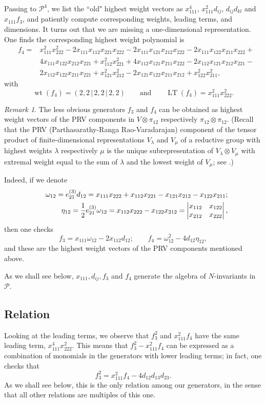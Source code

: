 \documentclass[reqno,11pt]{amsart}
\theoremstyle{remark}
\newtheorem{rem}[equation]{Remark}
\theoremstyle{definition}
\numberwithin{equation}{section}
\newcommand{\bbar}{\,\big|\,}
\newcommand\la{{\lambda}}
\newcommand\ot{\otimes}
\newcommand{\eq}{\begin{equation}}
\newcommand{\eeq}{\end{equation}}
\newcommand{\Pol}{\mathcal{P}}
\newcommand{\wt}{\operatorname{wt}}
\newcommand{\LT}{\operatorname{LT}}
\begin{document}
Passing to $\Pol^4$, we list the ``old" highest weight vectors as $x_{111}^4$, $x_{111}^2d_{ij}$, $d_{ij}d_{kl}$ and $x_{111}f_3$, and patiently compute corresponding weights, leading terms, and dimensions. It turns out that we are missing a one-dimensional representation. One finds the corresponding highest weight polynomial is
\begin{eqnarray*}
& f_4 =& x_{111}^2 x_{222}^2 -2x_{111}x_{112}x_{221}x_{222} -2x_{111}x_{121}x_{212}x_{222}-2x_{111}x_{122}x_{211}x_{222}
+\\
&& 4x_{111}x_{122}x_{212}x_{221}+x_{112}^2 x_{221}^2+4x_{112}x_{121}x_{211}x_{222}-2x_{112}x_{121}x_{212}x_{221}-\\&& 2x_{112}x_{122}x_{211}x_{221}+x_{121}^2x_{212}^2-2x_{121}x_{122}x_{211}x_{212}+x_{122}^2x_{211}^2,
\end{eqnarray*}
with
\[
\wt(f_4)=(2,2\bbar 2,2\bbar 2,2)\qquad\text{and}\qquad \LT(f_4)=x_{111}^2x_{222}^2.
\]
\begin{rem} The less obvious generators $f_3$ and $f_4$ can be obtained as highest weight vectors of the PRV components in $V\otimes\pi_{12}$ respectively $\pi_{12}\otimes\pi_{12}$. (Recall that the PRV (Parthasarathy-Ranga Rao-Varadarajan) component of the tensor product of finite-dimensional representations $V_\la$ and $V_\mu$ of a reductive group with highest weights $\la$ respectively $\mu$ is the unique subrepresentation of $V_\la\ot V_\mu$ with extremal weight equal to the sum of $\la$ and the lowest weight of $V_\mu$; see \cite{PRV}.)
	
Indeed, if we denote 
\begin{eqnarray*}
&&\omega_{12}=e_{21}^{(3)}d_{12}=x_{111}x_{222}+x_{112}x_{221}-x_{121}x_{212}-x_{122}x_{211};\\
&&\eta_{12}=\frac{1}{2}e_{21}^{(3)}\omega_{12}=x_{112}x_{222}-x_{122}x_{212}=
\left|\begin{matrix} x_{112}& x_{122}\cr x_{212}& x_{222}\end{matrix}\right|,
\end{eqnarray*}
then one checks
\[
f_3=x_{111}\omega_{12}-2x_{112}d_{12};\qquad f_4=\omega_{12}^2-4d_{12}\eta_{12},
\]
and these are the highest weight vectors of the PRV components mentioned above.
\end{rem}
As we shall see below, $x_{111},d_{ij},f_3$ and $f_4$ generate the algebra of $N$-invariants in $\Pol$.

\subsection{Relation} 
 Looking at the leading terms, we observe that $f_3^2$ and $x_{111}^2f_4$ have the same leading term, $x_{111}^4x_{222}^2$. This means that $f_3^2-x_{111}^2f_4$ can be expressed as a combination of monomials in the generators with lower leading terms; in fact, one checks that
\eq
\label{rel 222}
f_3^2=x_{111}^2f_4-4d_{12}d_{13}d_{23}.
\eeq
As we shall see below, this is the only relation among our generators, in the sense that all other relations are multiples of this one.
\end{document}

